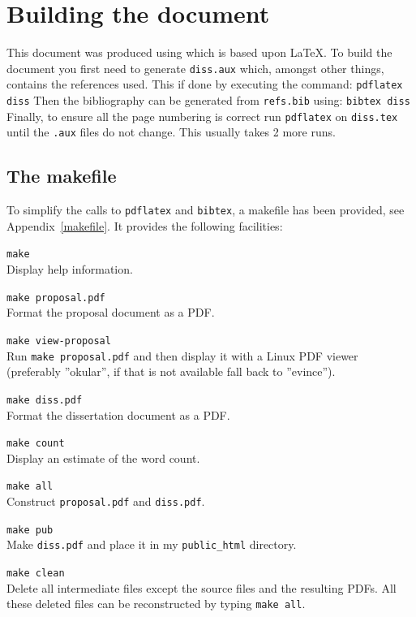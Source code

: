 \documentclass[12pt,a4paper,twoside,openright]{report}
\begin{document}
\section{Building the document}
This document was produced using \LaTeXe which is based upon
\LaTeX\cite{Lamport86}. To build the document you first need to
generate \texttt{diss.aux} which, amongst other things, contains the
references used. This if done by executing the command:
\texttt{pdflatex diss}
\noindent
Then the bibliography can be generated from \texttt{refs.bib} using:
\texttt{bibtex diss}
\noindent
Finally, to ensure all the page numbering is correct run \texttt{pdflatex}
on \texttt{diss.tex} until the \texttt{.aux} files do not change. This
usually takes 2 more runs.
\subsection{The makefile}
To simplify the calls to \texttt{pdflatex} and \texttt{bibtex},
a makefile has been provided, see Appendix~\ref{makefile}.
It provides the following facilities:
\begin{description}
\item\texttt{make} \\
Display help information.
\item\texttt{make proposal.pdf} \\
Format the proposal document as a PDF.
\item\texttt{make view-proposal} \\
Run \texttt{make proposal.pdf} and then display it with a Linux PDF viewer
(preferably ''okular'', if that is not available fall back to ''evince'').
\item\texttt{make diss.pdf} \\
Format the dissertation document as a PDF.
\item\texttt{make count} \\
Display an estimate of the word count.
\item\texttt{make all} \\
Construct \texttt{proposal.pdf} and \texttt{diss.pdf}.
\item\texttt{make pub} \\ Make \texttt{diss.pdf}
and place it in my \texttt{public\_html} directory.
\item\texttt{make clean} \\ Delete all intermediate files except the
source files and the resulting PDFs. All these deleted files can
be reconstructed by typing \texttt{make all}.
\end{description}
\end{document}
